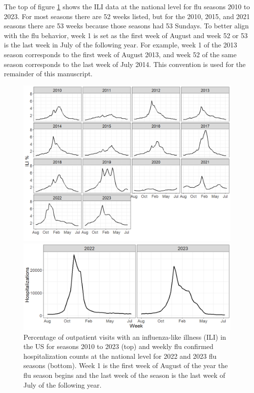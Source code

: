The top of figure \ref{fig:us_ili} shows the ILI data at the national level for 
flu seasons 2010 to 2023. For most seasons there are 52 weeks listed, but for 
the 2010, 2015, and 2021 seasons there are 53 weeks because those
seasons had 53 Sundays. 
To better align with the flu behavior, week 1 is set as the first week of 
August and week 52 or 53 is the last week in July of the following year. For 
example, week 1 of the 2013 season corresponds to the first week of August 2013, 
and week 52 of the same season corresponds to the last week of July 2014. This 
convention is used for the remainder of this manuscript. 

\begin{figure}[hbt!]
    \centering
    \includegraphics[scale=.5]{Images/us_ili_seasons.png}
    
    \centering
    \includegraphics[scale=.42]{Images/us_hospitalizations.png}
    \caption{Percentage of outpatient visits with an influenza-like illness 
    (ILI) in the US for seasons 2010 to 2023 (top) and weekly flu confirmed 
    hospitalization counts at the national level for 2022 and 2023 flu seasons 
    (bottom). Week 1 is the first week of August of the year the flu season 
    begins and the last week of the season is the last week of July of the 
    following year.}
    \label{fig:us_ili}
\end{figure}

